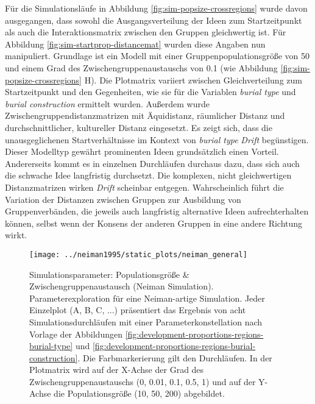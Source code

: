 \documentclass[openany,twoside,twocolumn]{book}
\begin{document}
Für die Simulationsläufe in Abbildung \ref{fig:sim-popsize-crossregions}
wurde davon ausgegangen, dass sowohl die Ausgangsverteilung der Ideen
zum Startzeitpunkt als auch die Interaktionsmatrix zwischen den Gruppen
gleichwertig ist. Für Abbildung \ref{fig:sim-startprop-distancemat}
wurden diese Angaben nun manipuliert. Grundlage ist ein Modell mit einer
Gruppenpopulationsgröße von 50 und einem Grad des
Zwischengruppenaustauschs von 0.1 (wie Abbildung
\ref{fig:sim-popsize-crossregions} H). Die Plotmatrix variiert zwischen
Gleichverteilung zum Startzeitpunkt und den Gegenheiten, wie sie für die
Variablen \emph{burial type} und \emph{burial construction} ermittelt
wurden. Außerdem wurde Zwischengruppendistanzmatrizen mit Äquidistanz,
räumlicher Distanz und durchschnittlicher, kultureller Distanz
eingesetzt. Es zeigt sich, dass die unausgeglichenen Startverhältnisse
im Kontext von \emph{burial type} \emph{Drift} begünstigen. Dieser
Modelltyp gewährt prominenten Ideen grundsätzlich einen Vorteil.
Andererseits kommt es in einzelnen Durchläufen durchaus dazu, dass sich
auch die schwache Idee langfristig durchsetzt. Die komplexen, nicht
gleichwertigen Distanzmatrizen wirken \emph{Drift} scheinbar entgegen.
Wahrscheinlich führt die Variation der Distanzen zwischen Gruppen zur
Ausbildung von Gruppenverbänden, die jeweils auch langfristig
alternative Ideen aufrechterhalten können, selbst wenn der Konsens der
anderen Gruppen in eine andere Richtung wirkt.

\begin{figure}[!t]

{\centering \texttt{[image: ../neiman1995/static\_plots/neiman\_general]} 

}

\caption[Simulationsparameter: Populationsgröße \& Zwischengruppenaustausch (Neiman Simulation)]{Simulationsparameter: Populationsgröße \& Zwischengruppenaustausch (Neiman Simulation). Parameterexploration für eine Neiman-artige Simulation. Jeder Einzelplot (A, B, C, ...) präsentiert das Ergebnis von acht Simulationsdurchläufen mit einer Parameterkonstellation nach Vorlage der Abbildungen \ref{fig:development-proportions-regions-burial-type} und \ref{fig:development-proportions-regions-burial-construction}. Die Farbmarkerierung gilt den Durchläufen. In der Plotmatrix wird auf der X-Achse der Grad des Zwischengruppenaustauschs (0, 0.01, 0.1, 0.5, 1) und auf der Y-Achse die Populationsgröße (10, 50, 200) abgebildet.}\label{fig:neiman-general}
\end{figure}
\end{document}
